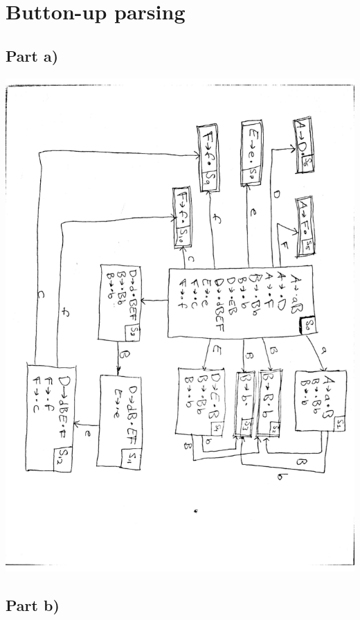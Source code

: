 \documentclass[paper=a4, fontsize=11pt]{scrartcl} %
\numberwithin{equation}{section} %
\numberwithin{figure}{section} %
\numberwithin{table}{section} %
\begin{document}
\section{Button-up parsing}
\subsection{Part a)}
\includegraphics[scale=.65]{oppg_3a.png}
\subsection{Part b)}
\end{document}
